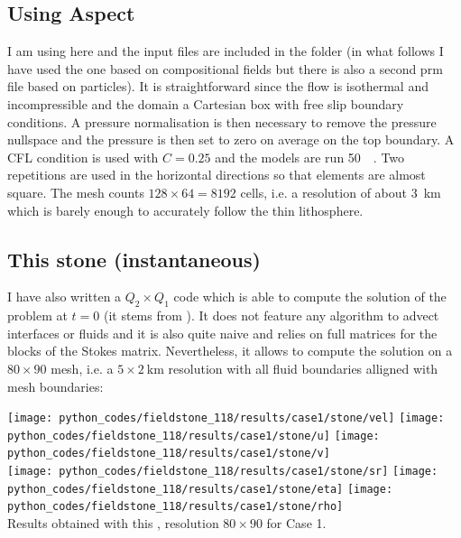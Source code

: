 \subsection*{Using Aspect}

I am using here \aspect and the input files are included in the folder (in 
what follows I have used the one based on compositional fields but there
is also a second prm file based on particles). It is straightforward 
since the flow is isothermal and incompressible and the domain a Cartesian box with 
free slip boundary conditions. A pressure normalisation is then necessary to remove 
the pressure nullspace and the pressure is then set to zero on average on the top boundary. 
A CFL condition is used with $C=0.25$ and the models 
are run 50~\si{\mega\year}. 
Two repetitions are used in the horizontal directions so that elements are almost square.
The mesh counts $128\times 64=8192$ cells, i.e. a resolution of about 3~\si{\km} which is barely enough to 
accurately follow the thin lithosphere.


\subsection*{This stone (instantaneous)}

I have also written a $Q_2\times Q_1$ code which is able to 
compute the solution of the problem at $t=0$ (it stems from ). 
It does not feature any algorithm to advect interfaces or fluids and
it is also quite naive and relies on full matrices for the 
blocks of the Stokes matrix. Nevertheless, it allows to compute the solution 
on a $80\times 90$ mesh, i.e. a $5\times 2~\si{\km}$ resolution with 
all fluid boundaries alligned with mesh boundaries:

\begin{center}
\texttt{[image: python\_codes/fieldstone\_118/results/case1/stone/vel]}
\texttt{[image: python\_codes/fieldstone\_118/results/case1/stone/u]}
\texttt{[image: python\_codes/fieldstone\_118/results/case1/stone/v]}\\
\texttt{[image: python\_codes/fieldstone\_118/results/case1/stone/sr]}
\texttt{[image: python\_codes/fieldstone\_118/results/case1/stone/eta]}
\texttt{[image: python\_codes/fieldstone\_118/results/case1/stone/rho]}\\
{\captionfont Results obtained with this \stone, resolution  $80\times 90$ for Case 1.}
\end{center}

